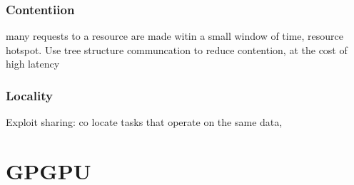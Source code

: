 \documentclass{article}
\begin{document}
\subsubsection*{Contentiion}
many requests to a resource are made witin a small window of time, resource hotspot. Use tree structure communcation to reduce contention, at the cost of high latency 
\subsubsection*{Locality}
Exploit sharing: co locate tasks that operate on the same data, 








\section{GPGPU}
\end{document}
